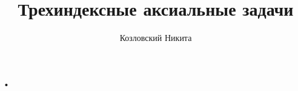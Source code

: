 \documentclass[10pt,a4paper]{article}
\author{Козловский Никита}
\title{Трехиндексные аксиальные задачи}
\begin{document}
•
\end{document}

